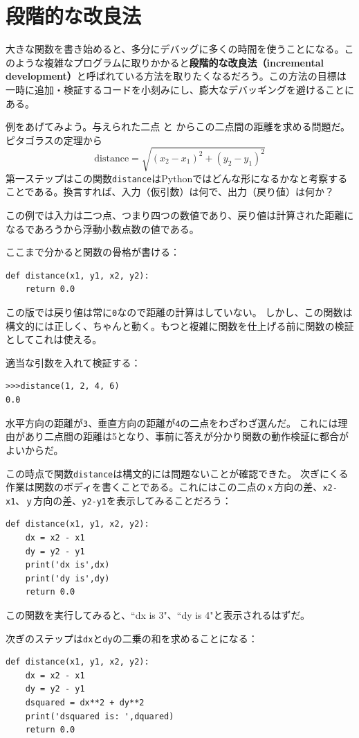\documentclass[a4j,12pt,makeidx]{jbook}
\begin{document}
\section{段階的な改良法}
大きな関数を書き始めると、多分にデバッグに多くの時間を使うことになる。このような複雑なプログラムに取りかかると{\bf 段階的な改良法（incremental development）}と呼ばれている方法を取りたくなるだろう。この方法の目標は一時に追加・検証するコードを小刻みにし、膨大なデバッギングを避けることにある。\par
例をあげてみよう。与えられた二点 と からこの二点間の距離を求める問題だ。ピタゴラスの定理から
 \begin{displaymath}
\mathrm{distance} = \sqrt{(x_2 - x_1)^2 + (y_2 - y_1)^2}
\end{displaymath}
第一ステップはこの関数{\tt distance}はPythonではどんな形になるかなと考察することである。換言すれば、入力（仮引数）は何で、出力（戻り値）は何か？\par
この例では入力は二つ点、つまり四つの数値であり、戻り値は計算された距離になるであろうから浮動小数点数の値である。\par
ここまで分かると関数の骨格が書ける：
\begin{verbatim}
def distance(x1, y1, x2, y2):
    return 0.0
\end{verbatim}
この版では戻り値は常に{\tt 0}なので距離の計算はしていない。
しかし、この関数は構文的には正しく、ちゃんと動く。もつと複雑に関数を仕上げる前に関数の検証としてこれは使える。 \par
適当な引数を入れて検証する：
\begin{verbatim}
>>>distance(1, 2, 4, 6)
0.0
\end{verbatim}
水平方向の距離が{\tt 3}、垂直方向の距離が{\tt 4}の二点をわざわざ選んだ。
これには理由があり二点間の距離は{\tt }5となり、事前に答えが分かり関数の動作検証に都合がよいからだ。\par
この時点で関数{\tt distance}は構文的には問題ないことが確認できた。
次ぎにくる作業は関数のボディを書くことである。これにはこの二点の{\tt ｘ}方向の差、{\tt x2-x1}、{\tt ｙ}方向の差、{\tt y2-y1}を表示してみることだろう：
\begin{verbatim}
def distance(x1, y1, x2, y2):
    dx = x2 - x1
    dy = y2 - y1
    print('dx is',dx)
    print('dy is',dy)
    return 0.0
\end{verbatim}
この関数を実行してみると、``dx is 3"、``dy is 4"と表示されるはずだ。\par
次ぎのステップは{\tt dx}と{\tt dy}の二乗の和を求めることになる：
\begin{verbatim}
def distance(x1, y1, x2, y2):
    dx = x2 - x1
    dy = y2 - y1
    dsquared = dx**2 + dy**2
    print('dsquared is: ',dquared)
    return 0.0
\end{verbatim}
\end{document}

